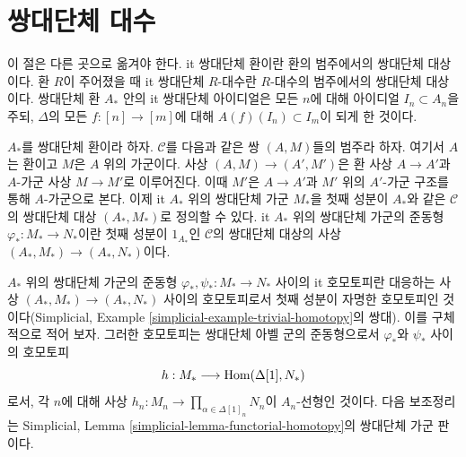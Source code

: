 \section{쌍대단체 대수}
\label{section-cosimplicial}

\noindent
이 절은 다른 곳으로 옮겨야 한다. {it 쌍대단체 환}이란 환의
범주에서의 쌍대단체 대상이다. 환 $R$이 주어졌을 때
{it 쌍대단체 $R$-대수}란 $R$-대수의 범주에서의 쌍대단체 대상이다.
쌍대단체 환 $A_*$ 안의 {it 쌍대단체 아이디얼}은 모든 $n$에 대해
아이디얼 $I_n \subset A_n$을 주되, $\Delta$의 모든
$f : [n] \to [m]$에 대해 $A(f)(I_n) \subset I_m$이 되게 한 것이다.

\medskip\noindent
$A_*$를 쌍대단체 환이라 하자. $\mathcal{C}$를 다음과 같은 쌍
$(A, M)$들의 범주라 하자. 여기서 $A$는 환이고 $M$은 $A$ 위의
가군이다. 사상 $(A, M) \to (A', M')$은 환 사상 $A \to A'$과
$A$-가군 사상 $M \to M'$로 이루어진다. 이때 $M'$은
$A \to A'$과 $M'$ 위의 $A'$-가군 구조를 통해 $A$-가군으로 본다.
이제 {it $A_*$ 위의 쌍대단체 가군 $M_*$}을 첫째 성분이
$A_*$와 같은 $\mathcal{C}$의 쌍대단체 대상 $(A_*, M_*)$로
정의할 수 있다. {it $A_*$ 위의 쌍대단체 가군의 준동형
$\varphi_* : M_* \to N_*$}이란 첫째 성분이 $1_{A_*}$인
$\mathcal{C}$의 쌍대단체 대상의 사상
$(A_*, M_*) \to (A_*, N_*)$이다.

\medskip\noindent
$A_*$ 위의 쌍대단체 가군의 준동형
$\varphi_*, \psi_* : M_* \to N_*$ 사이의 {it 호모토피}란
대응하는 사상 $(A_*, M_*) \to (A_*, N_*)$ 사이의 호모토피로서
첫째 성분이 자명한 호모토피인 것이다(Simplicial, Example
\ref{simplicial-example-trivial-homotopy}의 쌍대).
이를 구체적으로 적어 보자. 그러한 호모토피는 쌍대단체 아벨 군의
준동형으로서 $\varphi_*$와 $\psi_*$ 사이의 호모토피
$$
h : M_* \longrightarrow \mathop{\mathrm{Hom}}\nolimits(\Delta[1], N_*)
$$
로서, 각 $n$에 대해 사상
$h_n : M_n \to \prod_{\alpha \in \Delta[1]_n} N_n$이
$A_n$-선형인 것이다. 다음 보조정리는 Simplicial, Lemma
\ref{simplicial-lemma-functorial-homotopy}의 쌍대단체 가군 판이다.

